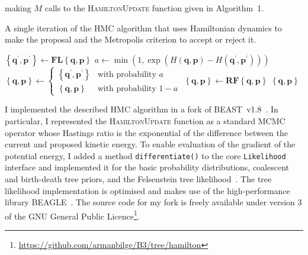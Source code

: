 \documentclass{article}
\renewcommand{\vec}[1]{\ensuremath{\boldsymbol{\mathbf{#1}}}}
\newcommand{\op}[1]{\ensuremath{\boldsymbol{\mathbf{#1}}}}
\begin{document}
        making $M$ calls to the \textsc{HamiltonUpdate} function given in
        Algorithm~1.
    \begin{algorithm}
        \caption{A single iteration of the \acl{HMC} algorithm that uses
                 Hamiltonian dynamics to make the proposal and the Metropolis
                 criterion to accept or reject it.}
        \begin{algorithmic}[1]
        \Function {HamiltonUpdate}{$\left\{\vec{q},\vec{p}\right\}$}
            \State $\left\{\vec{q}^\prime, \vec{p}^\prime\right\}
                \leftarrow \op{F}\op{L}\left\{\vec{q},\vec{p}\right\}$
            \State $a \leftarrow \min\left(1,
                \exp\left(
                    H\left(\vec{q}, \vec{p}\right) - H\left(\vec{q}^\prime,
                        \vec{p}^\prime\right)\right)\right)$
            \State $\left\{\vec{q},\vec{p}\right\} \leftarrow
                \begin{cases}
                    \left\{\vec{q}^\prime, \vec{p}^\prime\right\}
                        & \text{with probability } a \\
                    \left\{\vec{q},\vec{p}\right\}
                        & \text{with probability } 1 - a
                \end{cases}$
            \State $\left\{\vec{q},\vec{p}\right\} \leftarrow
                        \op{R}\op{F}\left\{\vec{q},\vec{p}\right\}$
            \State \Return $\left\{\vec{q},\vec{p}\right\}$
        \EndFunction
        \end{algorithmic}
    \end{algorithm}

    I implemented the described \ac{HMC} algorithm in a fork of
        BEAST~v1.8~\cite{Dru+12}.
    In particular, I represented the \textsc{HamiltonUpdate} function as a
        standard \ac{MCMC} operator whose Hastings ratio is the exponential of
        the difference between the current and proposed kinetic energy.
    To enable evaluation of the gradient of the potential energy, I added a
        method \texttt{differentiate()} to the core \texttt{Likelihood}
        interface and implemented it for the basic probability distributions,
        coalescent and birth-death tree priors, and the Felsenstein tree
        likelihood~\cite{Fel81}.
    The tree likelihood implementation is optimised and makes use of the
        high-performance library BEAGLE~\cite{Ayr+12}.
    The source code for my fork is freely available under version 3 of the GNU
        General Public
        Licence\footnote{\url{https://github.com/armanbilge/B3/tree/hamilton}}.
\end{document}
